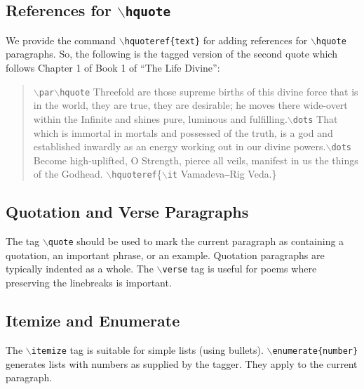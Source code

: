 \documentclass[11pt]{article}
\newcommand{\cmd}[1]{{\tt $\backslash$#1}}
\begin{document}
\subsection{References for \cmd{hquote}}

We provide the command \cmd{hquoteref\{text\}} for adding references
for \cmd{hquote} paragraphs. So, the following is the tagged version
of the second quote which follows Chapter 1 of Book 1 of ``The Life
Divine'':

\begin{quote}
  \cmd{par}\cmd{hquote} Threefold are those supreme births of this
  divine force that is in the world, they are true, they are
  desirable; he moves there wide-overt within the Infinite and shines
  pure, luminous and fulfilling.\cmd{dots} That which is immortal in
  mortals and possessed of the truth, is a god and established
  inwardly as an energy working out in our divine powers.\cmd{dots}
  Become high-uplifted, O Strength, pierce all veils, manifest in us
  the things of the Godhead.
  \cmd{hquoteref}\{\cmd{it} Vamadeva{\tt ---}Rig Veda.\}
\end{quote}

\subsection{Quotation and Verse Paragraphs}

The tag \cmd{quote} should be used to mark the current paragraph as
containing a quotation, an important phrase, or an example. Quotation
paragraphs are typically indented as a whole. The \cmd{verse} tag is
useful for poems where preserving the linebreaks is important.




\subsection{Itemize and Enumerate}

The \cmd{itemize} tag is suitable for simple lists (using
bullets). \cmd{enumerate\{number\}} generates lists with numbers as
supplied by the tagger. They apply to the current paragraph.

\end{document}
